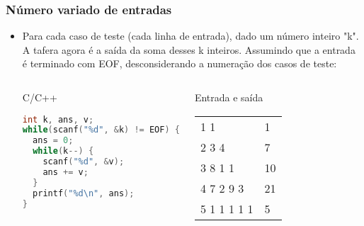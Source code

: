 \begin{frame} [fragile]
  \frametitle{Número variado de entradas}
    \begin{itemize}
      \item {\small Para cada caso de teste (cada linha de entrada), dado um número inteiro "k". A tafera agora é a saída da soma desses k inteiros. Assumindo que a entrada é terminado com EOF, desconsiderando a numeração dos casos de teste:}
      \begin{columns}
      \begin{block:ie}{C/C++}
	\begin{lstlisting}[language=c]
int k, ans, v;
while(scanf("%d", &k) != EOF) {
  ans = 0;
  while(k--) {
    scanf("%d", &v);
    ans += v;
  }
  printf("%d\n", ans);
}
	\end{lstlisting}
      \end{block:ie}

      \begin{block:ie}{Entrada e saída}\small
	\begin{tabularx}{\textwidth}{|X|X|}
	 1 1&1\\2 3 4&7\\3 8 1 1&10\\4 7 2 9 3&21\\5 1 1 1 1 1&5
	\end{tabularx}
      \end{block:ie}
    \end{columns}
  \end{itemize}
\end{frame}
